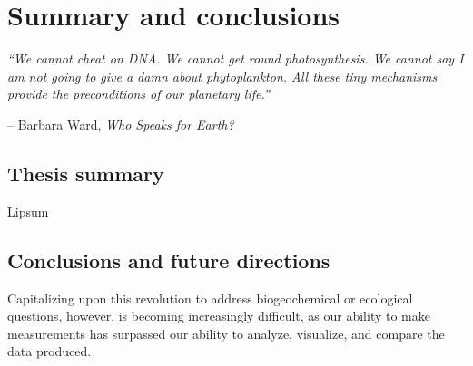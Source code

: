 

\chapter{Summary and conclusions}
\raggedbottom

\textit{``We cannot cheat on DNA. We cannot get round photosynthesis. We cannot say I am not going to give a damn about phytoplankton. All these tiny mechanisms provide the preconditions of our planetary life.'' }

\begin{flushright}-- Barbara Ward, \textit{Who Speaks for Earth?}\end{flushright}


\section{Thesis summary}
Lipsum 

\section{Conclusions and future directions}
Capitalizing upon this revolution to address biogeochemical or ecological questions, however, is becoming increasingly difficult, as our ability to make measurements has surpassed our ability to analyze, visualize, and compare the data produced.

